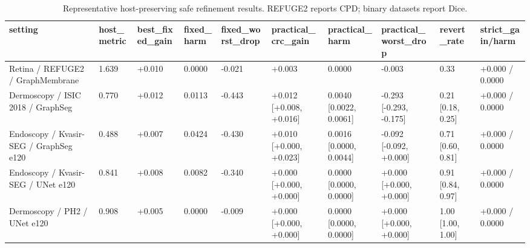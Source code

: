 \begin{table}[t]
\centering
\small
\caption{Representative host-preserving safe refinement results. REFUGE2 reports CPD; binary datasets report Dice.}
\label{tab:main_safety_table}
\begin{tabular}{llllllllll}
\toprule
setting & host\_metric & best\_fixed\_gain & fixed\_harm & fixed\_worst\_drop & practical\_crc\_gain & practical\_harm & practical\_worst\_drop & revert\_rate & strict\_gain/harm \\
\midrule
Retina / REFUGE2 / GraphMembrane & 1.639 & +0.010 & 0.0000 & -0.021 & +0.003 & 0.0000 & -0.003 & 0.33 & +0.000 / 0.0000 \\
Dermoscopy / ISIC 2018 / GraphSeg & 0.770 & +0.012 & 0.0113 & -0.443 & +0.012 [+0.008, +0.016] & 0.0040 [0.0022, 0.0061] & -0.293 [-0.293, -0.175] & 0.21 [0.18, 0.25] & +0.000 / 0.0000 \\
Endoscopy / Kvasir-SEG / GraphSeg e120 & 0.488 & +0.007 & 0.0424 & -0.430 & +0.010 [+0.000, +0.023] & 0.0016 [0.0000, 0.0044] & -0.092 [-0.092, +0.000] & 0.71 [0.60, 0.81] & +0.000 / 0.0000 \\
Endoscopy / Kvasir-SEG / UNet e120 & 0.841 & +0.008 & 0.0082 & -0.340 & +0.000 [+0.000, +0.000] & 0.0000 [0.0000, 0.0000] & +0.000 [+0.000, +0.000] & 0.91 [0.84, 0.97] & +0.000 / 0.0000 \\
Dermoscopy / PH2 / UNet e120 & 0.908 & +0.005 & 0.0000 & -0.009 & +0.000 [+0.000, +0.000] & 0.0000 [0.0000, 0.0000] & +0.000 [+0.000, +0.000] & 1.00 [1.00, 1.00] & +0.000 / 0.0000 \\
\bottomrule
\end{tabular}
\end{table}
